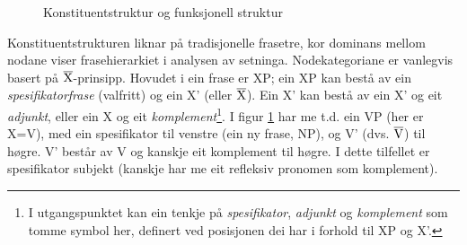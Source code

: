 \documentclass[12pt,a4paper,oneside,draft]{report}
\newcommand{\xbar}{$\rm\overline{X}$}
\newcommand{\proj}[2]{\begin{tabular}{c}\footnotesize{#1}\\\normalsize{#2}\end{tabular}}
\newcommand{\ua}{\ensuremath{\uparrow}}
\newcommand{\da}{\ensuremath{\downarrow}}
\begin{document}
 \begin{figure}[htp]
    \centering

    \caption{Konstituentstruktur og funksjonell struktur}
   \label{fig:f-og-c-struktur}
 \end{figure}

 Konstituentstrukturen liknar på tradisjonelle frasetre, kor dominans
 mellom nodane viser frasehierarkiet i analysen av
 setninga. Nodekategoriane er vanlegvis basert på
 \xbar-prinsipp. Hovudet i ein frase er XP; ein XP kan bestå av ein
 \emph{spesifikatorfrase} (valfritt) og ein X' (eller \xbar). Ein X' kan
 bestå av ein X' og eit \emph{adjunkt}, eller ein X og eit
 \emph{komplement}\footnote{I utgangspunktet kan ein tenkje på \emph{spesifikator}, \emph{adjunkt}
        og \emph{komplement} som tomme symbol her, definert ved posisjonen
        dei har i forhold til XP og X'. }. I figur \ref{fig:f-og-c-struktur} har me
 t.d. ein VP (her er X=V), med ein spesifikator til venstre (ein ny
 frase, NP), og V' (dvs. $\rm\overline{V}$) til høgre. V' består av V
 og kanskje eit komplement til høgre. I dette tilfellet er
 spesifikator subjekt (kanskje har me eit refleksiv pronomen som
 komplement).
\end{document}
